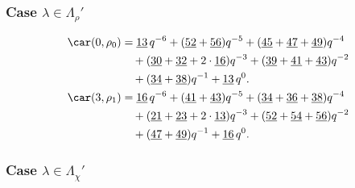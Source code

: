 \subsubsection{Case $\lambda\in \Lambda_\rho'$}

\begin{align*}
	\car(0,\rho_{0})
	&=\underline{13}\,q^{-6}+(\underline{52}+\underline{56})q^{-5}+(\underline{45}+\underline{47}+\underline{49})q^{-4}\\
	&\quad+(\underline{30}+\underline{32}+2\cdot\underline{16})q^{-3}+(\underline{39}+\underline{41}+\underline{43})q^{-2}\\
	&\quad+(\underline{34}+\underline{38})q^{-1}+\underline{13}\,q^0.\\
	\car(3,\rho_{1})
	&=\underline{16}\,q^{-6}+(\underline{41}+\underline{43})q^{-5}+(\underline{34}+\underline{36}+\underline{38})q^{-4}\\
	&\quad+(\underline{21}+\underline{23}+2\cdot\underline{13})q^{-3}+(\underline{52}+\underline{54}+\underline{56})q^{-2}\\
	&\quad+(\underline{47}+\underline{49})q^{-1}+\underline{16}\,q^0.
\end{align*}

\subsubsection{Case $\lambda\in \Lambda_\chi'$}

